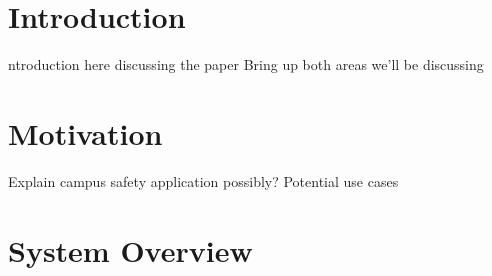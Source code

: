 \documentclass[10pt,conference]{IEEEtran}
\begin{document}





\maketitle

\IEEEdisplaynontitleabstractindextext

\IEEEpeerreviewmaketitle






\section{Introduction}


 ntroduction here discussing the paper
 Bring up both areas we'll be discussing 






\section{Motivation}

Explain campus safety application possibly? Potential use cases







\section{System Overview}
\end{document}
